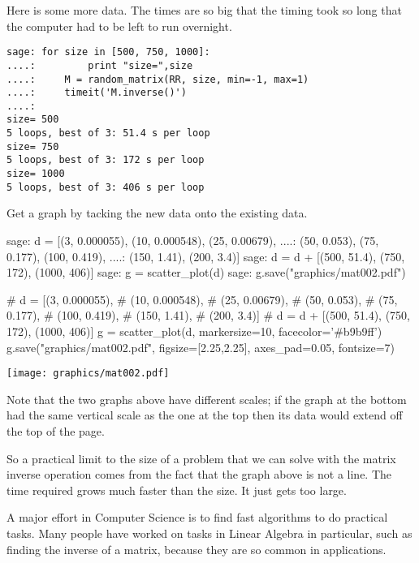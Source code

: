Here is some more data.
The times are so big that the timing took so long that
the computer had to be left to run overnight.
\begin{lstlisting}
sage: for size in [500, 750, 1000]:                             
....:         print "size=",size
....:     M = random_matrix(RR, size, min=-1, max=1)
....:     timeit('M.inverse()')
....: 
size= 500
5 loops, best of 3: 51.4 s per loop
size= 750
5 loops, best of 3: 172 s per loop
size= 1000
5 loops, best of 3: 406 s per loop
\end{lstlisting}
Get a graph by tacking the new data onto the existing data.
\begin{sagecommandline}
sage: d = [(3, 0.000055), (10, 0.000548), (25, 0.00679),  
....:      (50, 0.053), (75, 0.177), (100, 0.419), 
....:      (150, 1.41), (200, 3.4)]
sage: d = d + [(500, 51.4), (750, 172), (1000, 406)]
sage: g = scatter_plot(d)                           
sage: g.save("graphics/mat002.pdf")                      
\end{sagecommandline}
\begin{sagesilent}
# d = [(3, 0.000055),    
#      (10, 0.000548), 
#      (25, 0.00679),  
#      (50, 0.053), 
#      (75, 0.177), 
#      (100, 0.419), 
#      (150, 1.41), 
#      (200, 3.4)]
# d = d + [(500, 51.4), (750, 172), (1000, 406)]
g = scatter_plot(d, markersize=10, facecolor='#b9b9ff')
g.save("graphics/mat002.pdf", figsize=[2.25,2.25], axes_pad=0.05, fontsize=7)              
\end{sagesilent}
\begin{center}
  \texttt{[image: graphics/mat002.pdf]}
\end{center}
Note that the two graphs above have different scales;
if the graph at the bottom had the same vertical scale as the one at the top
then its data would extend off the top of the page.

So a practical limit to the size of a problem that we can solve with
the matrix inverse operation comes from the fact that the graph above is
not a line.
The time required grows much faster than the size.
It just gets too large. 

A major effort in Computer Science is to find fast algorithms to 
do practical tasks.
Many people have worked on tasks in Linear Algebra in particular,
such as finding the inverse of a matrix, because
they are so common in applications.

\endinput


TODO:
